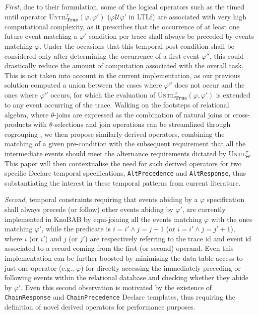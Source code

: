 \documentclass[sigconf]{acmart}
\begin{document}
\textit{First}, due to their formulation, some of the logical operators such as the timed until operator \textsc{Until}$^\tau_\textbf{True}(\varphi,\varphi')$ ($\varphi \mathcal{U}\varphi'$ in LTL\textsf{f}) are associated with very high computational complexity, as it prescribes that the occurrence of at least one future event matching a $\varphi'$ condition per trace shall always be preceded by events matching $\varphi$. Under the occasions that this temporal post-condition shall be considered only after determining the occurrence of a first event  $\varphi''$, this could drastically reduce the amount of computation associated with the overall task. This is not taken into account in the current implementation, as our previous solution computed a union between the cases where $\varphi''$ does not occur and the ones where $\varphi''$ occurs, for which the evaluation of \textsc{Until}$^\tau_\textbf{True}(\varphi,\varphi')$ is extended to any event occurring of the trace. Walking on the footsteps of relational algebra, where $\theta$-joins are expressed as the combination of natural joins \cite{DBLP:books/mg/AtzeniCPT99} or cross-products \cite{10.5555/2842853} with $\theta$-selections and join operations can be streamlined through cogrouping \cite{DBLP:books/x/dittrich2016}, we then propose similarly derived operators, combining the matching of a given pre-condition with the subsequent requirement that all the intermediate events should meet the alternance requirements dictated by \textsc{Until}$^\tau_\Theta$. This paper will then contextualise the need for such derived operators for two specific Declare temporal specifications, \texttt{AltPrecedence} and \texttt{AltResponse}, thus substantiating the interest in these temporal patterns from current literature.

\textit{Second}, temporal constraints requiring that events abiding by a $\varphi$ specification shall always precede (or follow) other events abiding by $\varphi'$, are currently implemented in KnoBAB by equi-joining all the events matching  $\varphi$ with the ones matching $\varphi'$, while the predicate is $i=i' \wedge j=j-1$ (or $i=i' \wedge j=j'+1$), where $i$ (or $i'$) and $j$ (or $j'$) are respectively referring to the trace id and event id associated to a record coming from the first (or second) operand. Even this implementation can be further boosted by minimising the data table access to just one operator (e.g., $\varphi$) for directly accessing the immediately preceding or following events within the relational database and checking whether they abide by $\varphi'$. Even this second observation is motivated by the existence of \texttt{ChainResponse} and \texttt{ChainPrecedence} Declare templates, thus requiring the definition of novel derived operators for performance purposes.
\end{document}
